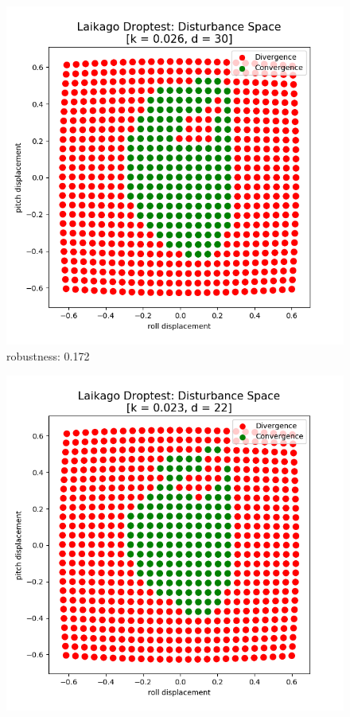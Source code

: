 \begin{figure}[h]
\begin{minipage}{0.33\textwidth}
            \includegraphics[width=\textwidth]{figures/droptest_ds_medium_correct.png} \\
            \small robustness: 0.172%
        \end{minipage}
        \begin{minipage}{0.33\textwidth}
            \centering
            \includegraphics[width=\textwidth]{figures/droptest_ds_opt_correct.png} \\

\end{minipage}
\end{figure}
